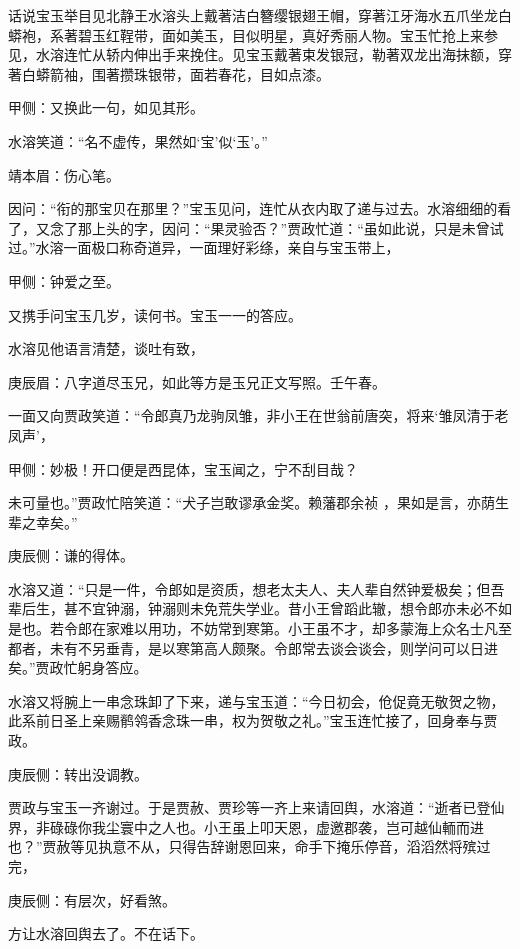 \begin{parag}
    话说宝玉举目见北静王水溶头上戴著洁白簪缨银翅王帽，穿著江牙海水五爪坐龙白蟒袍，系著碧玉红鞓带，面如美玉，目似明星，真好秀丽人物。宝玉忙抢上来参见，水溶连忙从轿内伸出手来挽住。见宝玉戴著束发银冠，勒著双龙出海抹额，穿著白蟒箭袖，围著攒珠银带，面若春花，目如点漆。\begin{note}甲侧：又换此一句，如见其形。\end{note}水溶笑道：“名不虚传，果然如‘宝’似‘玉’。”\begin{note}靖本眉：伤心笔。\end{note}因问：“衔的那宝贝在那里？”宝玉见问，连忙从衣内取了递与过去。水溶细细的看了，又念了那上头的字，因问：“果灵验否？”贾政忙道：“虽如此说，只是未曾试过。”水溶一面极口称奇道异，一面理好彩绦，亲自与宝玉带上，\begin{note}甲侧：钟爱之至。\end{note}又携手问宝玉几岁，读何书。宝玉一一的答应。
\end{parag}


\begin{parag}
    水溶见他语言清楚，谈吐有致，\begin{note}庚辰眉：八字道尽玉兄，如此等方是玉兄正文写照。壬午春。\end{note}一面又向贾政笑道：“令郎真乃龙驹凤雏，非小王在世翁前唐突，将来‘雏凤清于老凤声’，\begin{note}甲侧：妙极！开口便是西昆体，宝玉闻之，宁不刮目哉？\end{note}未可量也。”贾政忙陪笑道：“犬子岂敢谬承金奖。赖藩郡余祯 ，果如是言，亦荫生辈之幸矣。”\begin{note}庚辰侧：谦的得体。\end{note}水溶又道：“只是一件，令郎如是资质，想老太夫人、夫人辈自然钟爱极矣；但吾辈后生，甚不宜钟溺，钟溺则未免荒失学业。昔小王曾蹈此辙，想令郎亦未必不如是也。若令郎在家难以用功，不妨常到寒第。小王虽不才，却多蒙海上众名士凡至都者，未有不另垂青，是以寒第高人颇聚。令郎常去谈会谈会，则学问可以日进矣。”贾政忙躬身答应。
\end{parag}


\begin{parag}
    水溶又将腕上一串念珠卸了下来，递与宝玉道：“今日初会，伧促竟无敬贺之物，此系前日圣上亲赐鹡鸰香念珠一串，权为贺敬之礼。”宝玉连忙接了，回身奉与贾政。\begin{note}庚辰侧：转出没调教。\end{note}贾政与宝玉一齐谢过。于是贾赦、贾珍等一齐上来请回舆，水溶道：“逝者已登仙界，非碌碌你我尘寰中之人也。小王虽上叩天恩，虚邀郡袭，岂可越仙輀而进也？”贾赦等见执意不从，只得告辞谢恩回来，命手下掩乐停音，滔滔然将殡过完，\begin{note}庚辰侧：有层次，好看煞。\end{note}方让水溶回舆去了。不在话下。
\end{parag}


